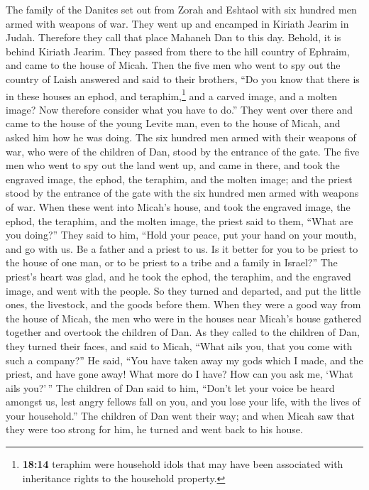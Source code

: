  The family of the Danites set out from Zorah and Eshtaol
with six hundred men armed with weapons of war.  They
went up and encamped in Kiriath Jearim in Judah. Therefore they call
that place Mahaneh Dan to this day. Behold, it is behind Kiriath Jearim.
 They passed from there to the hill country of Ephraim,
and came to the house of Micah.  Then the five men who
went to spy out the country of Laish answered and said to their
brothers, ``Do you know that there is in these houses an ephod, and
teraphim,\footnote{\textbf{18:14} teraphim were household idols that may
  have been associated with inheritance rights to the household
  property.} and a carved image, and a molten image? Now therefore
consider what you have to do.''  They went over there and
came to the house of the young Levite man, even to the house of Micah,
and asked him how he was doing.  The six hundred men
armed with their weapons of war, who were of the children of Dan, stood
by the entrance of the gate.  The five men who went to
spy out the land went up, and came in there, and took the engraved
image, the ephod, the teraphim, and the molten image; and the priest
stood by the entrance of the gate with the six hundred men armed with
weapons of war.  When these went into Micah's house, and
took the engraved image, the ephod, the teraphim, and the molten image,
the priest said to them, ``What are you doing?''  They
said to him, ``Hold your peace, put your hand on your mouth, and go with
us. Be a father and a priest to us. Is it better for you to be priest to
the house of one man, or to be priest to a tribe and a family in
Israel?''  The priest's heart was glad, and he took the
ephod, the teraphim, and the engraved image, and went with the people.
 So they turned and departed, and put the little ones,
the livestock, and the goods before them.  When they were
a good way from the house of Micah, the men who were in the houses near
Micah's house gathered together and overtook the children of Dan.
 As they called to the children of Dan, they turned their
faces, and said to Micah, ``What ails you, that you come with such a
company?''  He said, ``You have taken away my gods which
I made, and the priest, and have gone away! What more do I have? How can
you ask me, `What ails you?'\,''  The children of Dan
said to him, ``Don't let your voice be heard amongst us, lest angry
fellows fall on you, and you lose your life, with the lives of your
household.''  The children of Dan went their way; and
when Micah saw that they were too strong for him, he turned and went
back to his house.

